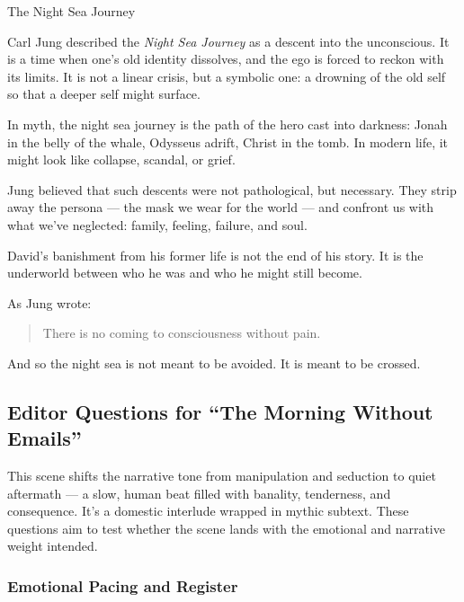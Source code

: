 \begin{PsychologicalSidebar}{The Night Sea Journey}

    Carl Jung described the \textit{Night Sea Journey} as a descent into the unconscious. It is a time 
    when one’s old identity dissolves, and the ego is forced to reckon with its limits. It is not a 
    linear crisis, but a symbolic one: a drowning of the old self so that a deeper self might surface.

    \medskip
    
    In myth, the night sea journey is the path of the hero cast into darkness: Jonah in the belly of the 
    whale, Odysseus adrift, Christ in the tomb. In modern life, it might look like collapse, scandal, 
    or grief. 

    \medskip
    
    Jung believed that such descents were not pathological, but necessary. They strip away the persona 
    --- the mask we wear for the world --- and confront us with what we’ve neglected: family, feeling, 
    failure, and soul.

    \medskip
    
    David’s banishment from his former life is not the end of his story. It is the underworld between 
    who he was and who he might still become.

    \medskip
    
    As Jung wrote: 

    \begin{quote}
        There is no coming to consciousness without pain.
    \end{quote}
    
    And so the night sea is not meant to be avoided.  It is meant to be crossed.
\end{PsychologicalSidebar}


\subsection*{Editor Questions for ``The Morning Without Emails''}

This scene shifts the narrative tone from manipulation and seduction to quiet aftermath — a slow, human beat filled with banality, tenderness, and consequence. It’s a domestic interlude wrapped in mythic subtext. These questions aim to test whether the scene lands with the emotional and narrative weight intended.

\subsubsection*{Emotional Pacing and Register}

